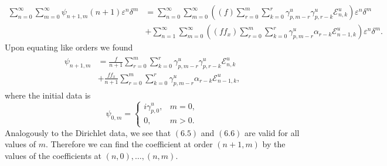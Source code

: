 \begin{align*}\sum_{n=0}^{\infty}\sum_{m=0}^{\infty}\psi_{n+1,m}(n+1)\varepsilon^n\delta^m&=
\sum_{n=0}^{\infty}\sum_{m=0}^{\infty}\left((f)\sum_{r=0}^m \sum_{k=0}^r \gamma^u_{p,m-r}\gamma^u_{p,r-k}\mathcal{E}^u_{n,k}\right)\varepsilon^n\delta^m\\&+
\sum_{n=1}^{\infty}\sum_{m=0}^{\infty}\left(( ff_x)\sum_{r=0}^m \sum_{k=0}^r \gamma^u_{p,m-r}\alpha_{r-k}\mathcal{E}^u_{n-1,k}\right)\varepsilon^n\delta^m
.\end{align*}
Upon equating like orders we found
\begin{align}
\begin{split}
\psi_{n+1,m} &= \frac{f}{n+1}\sum_{r=0}^m \sum_{k=0}^r \gamma^u_{p,m-r}\gamma^u_{p,r-k}\mathcal{E}^u_{n,k} \\&+
\frac{ff_x}{n+1}\sum_{r=0}^m \sum_{k=0}^r \gamma^u_{p,m-r}\alpha_{r-k}\mathcal{E}^u_{n-1,k},
\end{split}
\end{align}
where the initial data is
\begin{equation}\mathcal{\psi}_{0,m}= 
\begin{cases} 
i\gamma^u_{p,0}, & m=0, \\
0, & m>0.
\end{cases}  \end{equation}
Analogously to the Dirichlet data, we see that $(6.5)$ and $(6.6)$ are valid for all values of $m$. Therefore we can find the coefficient at order $(n+1,m)$ by the values of the coefficients at $(n,0),\ldots ,(n,m)$.